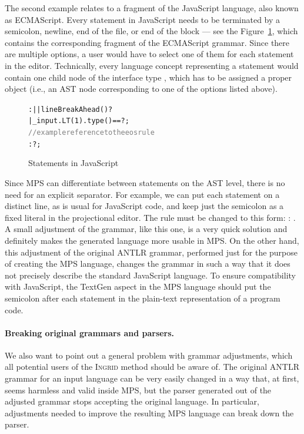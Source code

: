 The second example relates to a fragment of the JavaScript language, also known as ECMAScript.
Every statement in JavaScript needs to be terminated by a semicolon, newline, end of the file, or end of the block --- see the Figure~\ref{fig:JAVASCRIPTSTMT}, which contains the corresponding fragment of the ECMAScript grammar.
Since there are multiple options, a user would have to select one of them for each statement in the editor.
Technically, every language concept representing a statement would contain one child node of the interface type , which has to be assigned a proper object (i.e., an AST node corresponding to one of the options listed above).

\begin{figure}[ht]
\begin{framed}
\begin{alltt}
\small
{} :  |  | {lineBreakAhead()}? 
    | {{\_}input.LT(1).type() == }? ;
\textcolor{gray}{// example reference to the eos rule}
 :  ?  ;
\end{alltt}
\end{framed}
\caption{Statements in JavaScript}
\label{fig:JAVASCRIPTSTMT}
\end{figure}

Since MPS can differentiate between statements on the AST level, there is no need for an explicit separator.
For example, we can put each statement on a distinct line, as is usual for JavaScript code, and keep just the semicolon as a fixed literal in the projectional editor.
The  rule must be changed to this form:  : \antlrliteral{;}.
A small adjustment of the grammar, like this one, is a very quick solution and definitely makes the generated language more usable in MPS.
On the other hand, this adjustment of the original ANTLR grammar, performed just for the purpose of creating the MPS language, changes the grammar in such a way that it does not precisely describe the standard JavaScript language.
To ensure compatibility with JavaScript, the TextGen aspect in the MPS language should put the semicolon after each statement in the plain-text representation of a program code.

\paragraph{Breaking original grammars and parsers.}
We also want to point out a general problem with grammar adjustments, which all potential users of the \textsc{Ingrid} method should be aware of.
The original ANTLR grammar for an input language can be very easily changed in a way that, at first, seems harmless and valid inside MPS, but the parser generated out of the adjusted grammar stops accepting the original language.
In particular, adjustments needed to improve the resulting MPS language can break down the parser.

